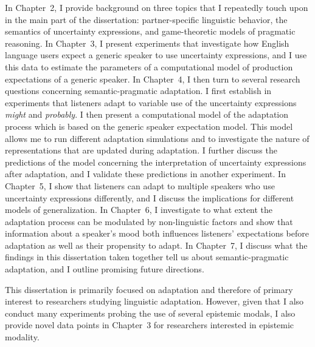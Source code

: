 In Chapter~2, I provide background on three topics that I repeatedly
touch upon in the main part of the dissertation: partner-specific linguistic behavior, 
the semantics of uncertainty expressions, and game-theoretic models of pragmatic reasoning.
In Chapter~3, I present experiments that investigate how English language users expect a generic speaker
to use uncertainty expressions, and I use this data to estimate the parameters of a computational model of 
production expectations of a generic speaker. In Chapter~4, I then turn to several research questions concerning
semantic-pragmatic adaptation. I first establish in experiments that listeners adapt to variable use of the uncertainty
expressions \textit{might} and \textit{probably}. I then present a computational model of the adaptation process which
is based on the generic speaker expectation model. This model allows me to run different adaptation simulations and
to investigate the nature of representations that are updated during adaptation. I further discuss the predictions 
of the model concerning the interpretation of uncertainty expressions after adaptation, and I validate these predictions
in another experiment. In Chapter~5, I show that listeners can adapt to multiple speakers who use uncertainty expressions differently,
and I discuss the implications for different models of generalization. In Chapter~6, I investigate to what extent the adaptation
process can be modulated by non-linguistic factors and show that information about a speaker's mood both influences
listeners' expectations before adaptation as well as their propensity to adapt. In Chapter~7, I discuss what the findings in this
dissertation taken together tell us about semantic-pragmatic adaptation, and I outline promising future directions.

This dissertation is primarily focused on adaptation and therefore of primary interest to researchers studying linguistic adaptation.
However, given that I also conduct many experiments probing the use of several epistemic modals, I also provide novel data points in Chapter~3
for researchers interested in epistemic modality.



